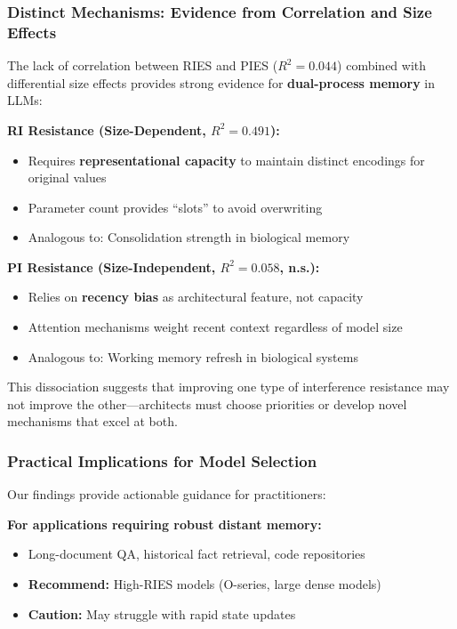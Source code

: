 \documentclass{article}
\begin{document}
\subsubsection{Distinct Mechanisms: Evidence from Correlation and Size Effects}

The lack of correlation between RIES and PIES ($R^2 = 0.044$) combined with differential size effects provides strong evidence for \textbf{dual-process memory} in LLMs:

\textbf{RI Resistance (Size-Dependent, $R^2 = 0.491$):}
\begin{itemize}[itemsep=1pt,topsep=2pt,parsep=0pt]
    \item Requires \textbf{representational capacity} to maintain distinct encodings for original values
    \item Parameter count provides ``slots'' to avoid overwriting
    \item Analogous to: Consolidation strength in biological memory
\end{itemize}

\textbf{PI Resistance (Size-Independent, $R^2 = 0.058$, n.s.):}
\begin{itemize}[itemsep=1pt,topsep=2pt,parsep=0pt]
    \item Relies on \textbf{recency bias} as architectural feature, not capacity
    \item Attention mechanisms weight recent context regardless of model size
    \item Analogous to: Working memory refresh in biological systems
\end{itemize}

This dissociation suggests that improving one type of interference resistance may not improve the other---architects must choose priorities or develop novel mechanisms that excel at both.

\subsubsection{Practical Implications for Model Selection}

Our findings provide actionable guidance for practitioners:

\textbf{For applications requiring robust distant memory:}
\begin{itemize}[itemsep=1pt,topsep=2pt,parsep=0pt]
    \item Long-document QA, historical fact retrieval, code repositories
    \item \textbf{Recommend:} High-RIES models (O-series, large dense models)
    \item \textbf{Caution:} May struggle with rapid state updates
\end{itemize}
\end{document}
